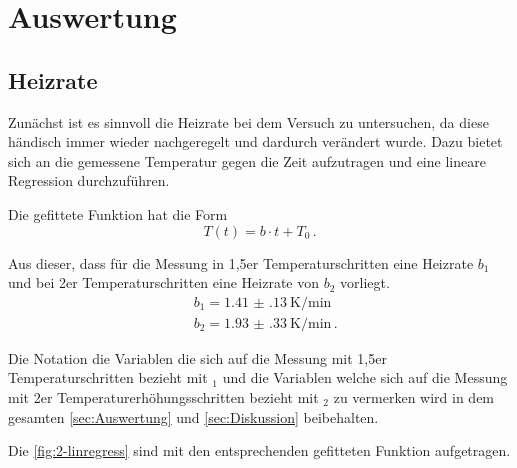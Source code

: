 \newpage
\section{Auswertung}
\label{sec:Auswertung}

\subsection{Heizrate}
\label{sec:heiss}
Zunächst ist es sinnvoll die Heizrate bei dem Versuch zu untersuchen, da diese händisch immer wieder nachgeregelt und dardurch verändert wurde. Dazu bietet sich an 
die gemessene Temperatur gegen die Zeit aufzutragen und eine lineare Regression durchzuführen.

Die gefittete Funktion hat die Form
\begin{equation*}
  T(t) = b \cdot t + T_0 \, .
\end{equation*}

\noindent
Aus dieser, dass für die Messung in 1,5er Temperaturschritten eine Heizrate $b_1$ und bei 2er Temperaturschritten eine Heizrate von $b_2$ vorliegt. 
\begin{align*}
  &b_1 = \SI{1.41(13)}{\kelvin\per\minute} \\
  &b_2 = \SI{1.93(33)}{\kelvin\per\minute} \, .
\end{align*}

Die Notation die Variablen die sich auf die Messung mit 1,5er Temperaturschritten bezieht mit $_1$ und die Variablen welche sich auf die Messung mit 2er Temperaturerhöhungsschritten 
bezieht mit $_2$ zu vermerken wird in dem gesamten \autoref{sec:Auswertung} und \autoref{sec:Diskussion} beibehalten.

\noindent
Die \autoref{fig:2-linregress} sind mit den entsprechenden gefitteten Funktion aufgetragen.

